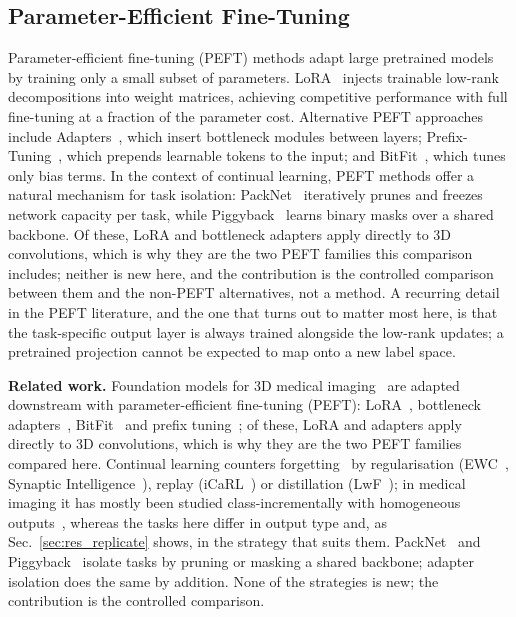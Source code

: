 \iffull\documentclass[journal]{IEEEtran}\else\documentclass[journal,twoside,web]{ieeecolor}\usepackage{generic}\fi
\begin{document}
\subsection{Parameter-Efficient Fine-Tuning}

Parameter-efficient fine-tuning (PEFT) methods adapt large pretrained models by training only a small subset of parameters. LoRA~\cite{hu2022lora} injects trainable low-rank decompositions into weight matrices, achieving competitive performance with full fine-tuning at a fraction of the parameter cost. Alternative PEFT approaches include Adapters~\cite{houlsby2019}, which insert bottleneck modules between layers; Prefix-Tuning~\cite{prefix_tuning}, which prepends learnable tokens to the input; and BitFit~\cite{bitfit}, which tunes only bias terms. In the context of continual learning, PEFT methods offer a natural mechanism for task isolation: PackNet~\cite{packnet} iteratively prunes and freezes network capacity per task, while Piggyback~\cite{piggyback} learns binary masks over a shared backbone. Of these, LoRA and bottleneck adapters apply directly to 3D convolutions, which is why they are the two PEFT families this comparison includes; neither is new here, and the contribution is the controlled comparison between them and the non-PEFT alternatives, not a method. A recurring detail in the PEFT literature, and the one that turns out to matter most here, is that the task-specific output layer is always trained alongside the low-rank updates; a pretrained projection cannot be expected to map onto a new label space.


\else
\textbf{Related work.} Foundation models for 3D medical imaging~\cite{fomo2025,unetr,sammed3d} are adapted downstream with parameter-efficient fine-tuning (PEFT): LoRA~\cite{hu2022lora}, bottleneck adapters~\cite{houlsby2019}, BitFit~\cite{bitfit} and prefix tuning~\cite{prefix_tuning}; of these, LoRA and adapters apply directly to 3D convolutions, which is why they are the two PEFT families compared here. Continual learning counters forgetting~\cite{mccloskey1989catastrophic} by regularisation (EWC~\cite{kirkpatrick2017}, Synaptic Intelligence~\cite{zenke2017continual}), replay (iCaRL~\cite{rebuffi2017icarl}) or distillation (LwF~\cite{li2017lwf}); in medical imaging it has mostly been studied class-incrementally with homogeneous outputs~\cite{derakhshani2022lifelonger,gonzalez2023lifelong}, whereas the tasks here differ in output type and, as Sec.~\ref{sec:res_replicate} shows, in the strategy that suits them. PackNet~\cite{packnet} and Piggyback~\cite{piggyback} isolate tasks by pruning or masking a shared backbone; adapter isolation does the same by addition. None of the strategies is new; the contribution is the controlled comparison.
\fi  %
\end{document}
